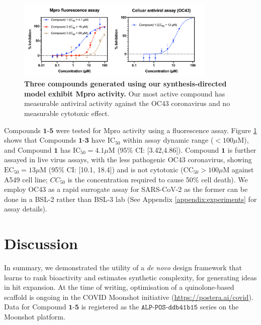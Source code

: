 \begin{figure}[!th]
 \centering
 \includegraphics[width=0.85\textwidth]{Chapters/Ranking/Figs/data_curve.pdf}
 \caption{\textbf{Three compounds generated using our synthesis-directed model exhibit Mpro activity.} Our most active compound has measurable antiviral activity against the OC43 coronavirus and no measurable cytotoxic effect.}
 \label{fig:data}
\end{figure}

Compounds $\mathbf{1}$-$\mathbf{5}$ were tested for Mpro activity using a fluorescence assay. Figure \ref{fig:data} shows that Compounds $\mathbf{1}$-$\mathbf{3}$ have $\mathrm{IC}_{50}$ within assay dynamic range ($<100 \mu$M), and Compound $\mathbf{1}$ has $\mathrm{IC}_{50} = 4.1 \mu$M (95\% CI: [3.42,4.86]). Compound $\mathbf{1}$ is further assayed in live virus assays, with the less pathogenic OC43 coronavirus, showing $\mathrm{EC}_{50} = 13 \mu$M (95\% CI: [10.1, 18.4]) and is not cytotoxic ($\mathrm{CC}_{50}>100 \mu$M against A549 cell line; $CC_{50}$ is the concentration required to cause 50\% cell death). We employ OC43 as a rapid surrogate assay for SARS-CoV-2 as the former can be done in a BSL-2 rather than BSL-3 lab (See Appendix \ref{appendix:experiments} for assay details). %

\section{Discussion} \label{sec:discussion}

In summary, we demonstrated the utility of a \emph{de novo} design framework that learns to rank bioactivity and estimates synthetic complexity, for generating ideas in hit expansion. At the time of writing, optimisation of a quinolone-based scaffold is ongoing in the COVID Moonshot initiative (\url{https://postera.ai/covid}). Data for Compound $\mathbf{1}$-$\mathbf{5}$ is registered as the $\texttt{ALP-POS-ddb41b15}$ series on the Moonshot platform. 

